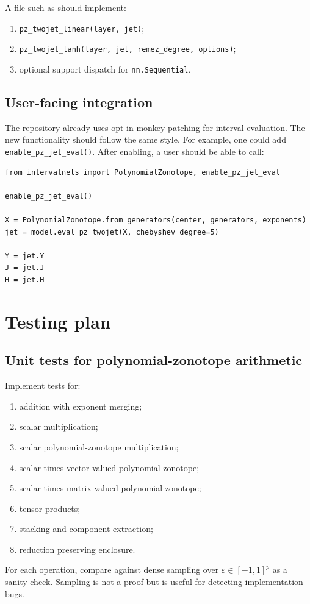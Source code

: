 \documentclass[11pt]{article}
\newcommand{\eps}{\varepsilon}
\begin{document}
A file such as  should implement:
\begin{enumerate}[label=(\roman*)]
    \item \texttt{pz\_twojet\_linear(layer, jet)};
    \item \texttt{pz\_twojet\_tanh(layer, jet, remez\_degree, options)};
    \item optional support dispatch for \texttt{nn.Sequential}.
\end{enumerate}

\subsection{User-facing integration}

The repository already uses opt-in monkey patching for interval evaluation. The new functionality should follow the same style. For example, one could add \texttt{enable\_pz\_jet\_eval()}. After enabling, a user should be able to call:
\begin{verbatim}
from intervalnets import PolynomialZonotope, enable_pz_jet_eval

enable_pz_jet_eval()

X = PolynomialZonotope.from_generators(center, generators, exponents)
jet = model.eval_pz_twojet(X, chebyshev_degree=5)

Y = jet.Y
J = jet.J
H = jet.H
\end{verbatim}

\section{Testing plan}

\subsection{Unit tests for polynomial-zonotope arithmetic}

Implement tests for:
\begin{enumerate}[label=(\roman*)]
    \item addition with exponent merging;
    \item scalar multiplication;
    \item scalar polynomial-zonotope multiplication;
    \item scalar times vector-valued polynomial zonotope;
    \item scalar times matrix-valued polynomial zonotope;
    \item tensor products;
    \item stacking and component extraction;
    \item reduction preserving enclosure.
\end{enumerate}
For each operation, compare against dense sampling over \(\eps\in[-1,1]^p\) as a sanity check. Sampling is not a proof but is useful for detecting implementation bugs.
\end{document}

